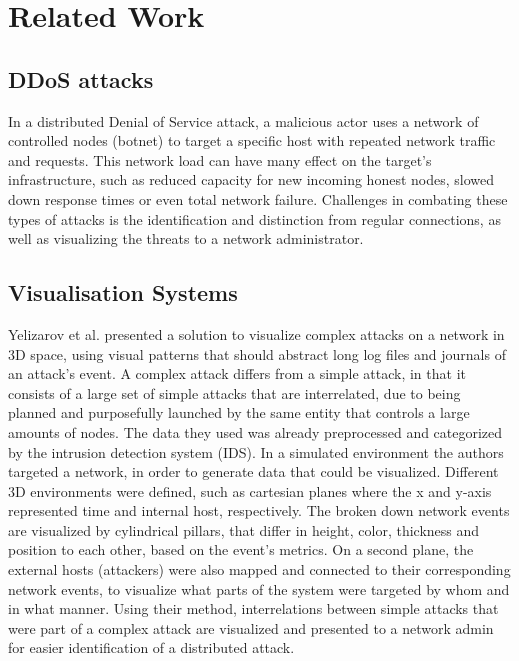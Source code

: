 \chapter{Related Work}

\section{DDoS attacks}
In a distributed Denial of Service attack, a malicious actor uses a network of controlled nodes (botnet) to target a specific host with repeated network traffic and requests. This network load can have many effect on the target's infrastructure, such as reduced capacity for new incoming honest nodes, slowed down response times or even total network failure. Challenges in combating these types of attacks is the identification and distinction from regular connections, as well as visualizing the threats to a network administrator.
\section{Visualisation Systems}
Yelizarov et al.\cite{yelizarov} presented a solution to visualize complex attacks on a network in 3D space, using visual patterns that should abstract long log files and journals of an attack's event. A complex attack differs from a simple attack, in that it consists of a large set of simple attacks that are interrelated, due to being planned and purposefully launched by the same entity that controls a large amounts of nodes. The data they used was already preprocessed and categorized by the intrusion detection system (IDS). In a simulated environment the authors targeted a network, in order to generate data that could be visualized. Different 3D environments were defined, such as cartesian planes where the x and y-axis represented time and internal host, respectively. The broken down network events are visualized by cylindrical pillars, that differ in height, color, thickness and position to each other, based on the event's metrics. On a second plane, the external hosts (attackers) were also mapped and connected to their corresponding network events, to visualize what parts of the system were targeted by whom and in what manner. Using their method, interrelations between simple attacks that were part of a complex attack are visualized and presented to a network admin for easier identification of a distributed attack.

